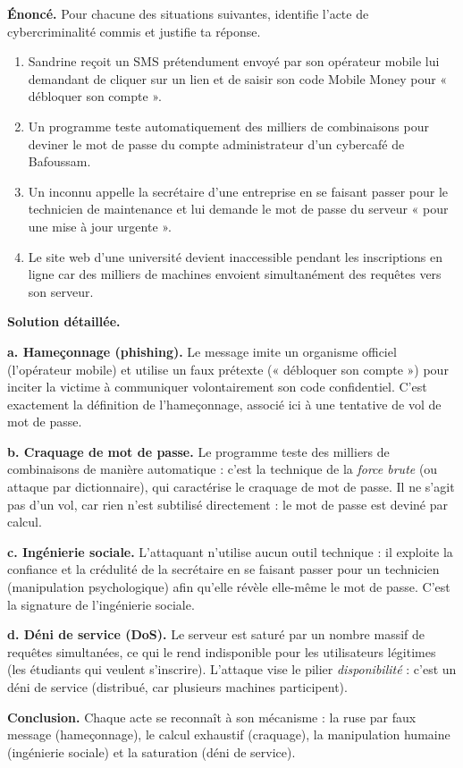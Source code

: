 \documentclass[11pt]{article}
\begin{document}
\begin{exoresolu}
\textbf{Énoncé.} Pour chacune des situations suivantes, identifie l'acte de cybercriminalité commis et justifie ta réponse.
\begin{enumerate}
  \item[a.] Sandrine reçoit un SMS prétendument envoyé par son opérateur mobile lui demandant de cliquer sur un lien et de saisir son code Mobile Money pour « débloquer son compte ».
  \item[b.] Un programme teste automatiquement des milliers de combinaisons pour deviner le mot de passe du compte administrateur d'un cybercafé de Bafoussam.
  \item[c.] Un inconnu appelle la secrétaire d'une entreprise en se faisant passer pour le technicien de maintenance et lui demande le mot de passe du serveur « pour une mise à jour urgente ».
  \item[d.] Le site web d'une université devient inaccessible pendant les inscriptions en ligne car des milliers de machines envoient simultanément des requêtes vers son serveur.
\end{enumerate}
\tcblower
\textbf{Solution détaillée.}

\textbf{a. Hameçonnage (phishing).} Le message imite un organisme officiel (l'opérateur mobile) et utilise un faux prétexte (« débloquer son compte ») pour inciter la victime à communiquer volontairement son code confidentiel. C'est exactement la définition de l'hameçonnage, associé ici à une tentative de vol de mot de passe.

\textbf{b. Craquage de mot de passe.} Le programme teste des milliers de combinaisons de manière automatique : c'est la technique de la \emph{force brute} (ou attaque par dictionnaire), qui caractérise le craquage de mot de passe. Il ne s'agit pas d'un vol, car rien n'est subtilisé directement : le mot de passe est deviné par calcul.

\textbf{c. Ingénierie sociale.} L'attaquant n'utilise aucun outil technique : il exploite la confiance et la crédulité de la secrétaire en se faisant passer pour un technicien (manipulation psychologique) afin qu'elle révèle elle-même le mot de passe. C'est la signature de l'ingénierie sociale.

\textbf{d. Déni de service (DoS).} Le serveur est saturé par un nombre massif de requêtes simultanées, ce qui le rend indisponible pour les utilisateurs légitimes (les étudiants qui veulent s'inscrire). L'attaque vise le pilier \emph{disponibilité} : c'est un déni de service (distribué, car plusieurs machines participent).

\textbf{Conclusion.} Chaque acte se reconnaît à son mécanisme : la ruse par faux message (hameçonnage), le calcul exhaustif (craquage), la manipulation humaine (ingénierie sociale) et la saturation (déni de service).
\end{exoresolu}
\end{document}

